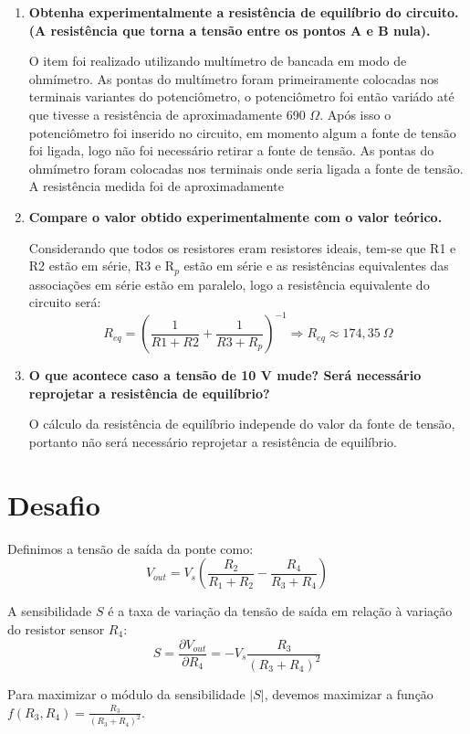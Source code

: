 \documentclass[a4paper,oneside,10pt]{article}
\begin{document}
\begin{enumerate}[label=\alph*]
	\item \textbf{Obtenha experimentalmente a resistência de equilíbrio do circuito. (A resistência que torna a tensão entre os pontos A e B nula).}
	
	O item foi realizado utilizando multímetro de bancada em modo de ohmímetro. As pontas do multímetro foram primeiramente colocadas nos terminais variantes do potenciômetro, o potenciômetro foi então variádo até que tivesse a resistência de 
	aproximadamente 690 $\Omega$. Após isso o potenciômetro foi inserido no circuito, em momento algum a fonte de tensão foi ligada, logo não foi necessário retirar a fonte de tensão. As pontas do ohmímetro foram colocadas nos terminais onde seria ligada a fonte de tensão. A resistência medida foi de aproximadamente \boxed{180 \Omega}
	
	\item \textbf{Compare o valor obtido experimentalmente com o valor teórico.}
	
	Considerando que todos os resistores eram resistores ideais, tem-se que R1 e R2 estão em série, R3 e R$_p$ estão em série e as resistências equivalentes das associações em série estão em paralelo, logo a resistência equivalente do circuito será:
	$$R_{eq} = (\frac{1}{R1+R2} + \frac{1}{R3+R_p})^{-1} \Rightarrow \boxed{ R_{eq} \approx 174,35\ \Omega}$$
	
	\item \textbf{O que acontece caso a tensão de 10 V mude? Será necessário reprojetar a resistência de equilíbrio?}
	
	O cálculo da resistência de equilíbrio independe do valor da fonte de tensão, portanto não será necessário reprojetar a resistência de equilíbrio.
\end{enumerate}


\section{Desafio}

Definimos a tensão de saída da ponte como:
$$
	V_{out} = V_s \left( \frac{R_2}{R_1 + R_2} - \frac{R_4}{R_3 + R_4} \right)
$$

A sensibilidade \(S\) é a taxa de variação da tensão de saída em relação à variação do resistor sensor \(R_4\):
$$
	S = \frac{\partial V_{out}}{\partial R_4} = - V_s \frac{R_3}{(R_3 + R_4)^2}
$$

Para maximizar o módulo da sensibilidade \(|S|\), devemos maximizar a função \(f(R_3, R_4) = \frac{R_3}{(R_3 + R_4)^2}\).
\end{document}
